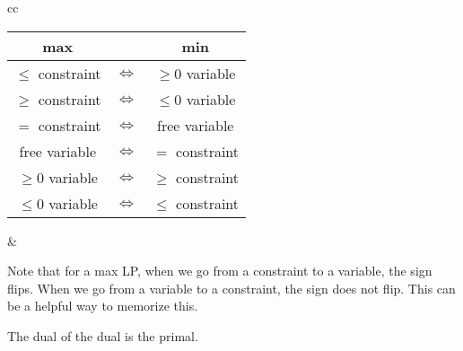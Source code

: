 \documentclass[a4paper]{report}
\begin{document}
	\begin{note}
		\begin{tabular}{cc}
			\begin{minipage}{.5\linewidth}\begin{tabular}{|c|c|c|}\hline \textbf{max} & & \textbf{min} \\ \hline $\leq$ constraint & $\iff$ & $\geq 0$ variable \\ \hline $\geq$ constraint & $\iff$ & $\leq 0$ variable \\ \hline $=$ constraint & $\iff$ & free variable \\ \hline \hline free variable & $\iff$ & $=$ constraint \\ \hline $\geq 0$ variable & $\iff$ & $\geq$ constraint \\ \hline $\leq 0$ variable & $\iff$ & $\leq$ constraint \\ \hline\end{tabular}\end{minipage} & \begin{minipage}{.5\linewidth}Note that for a max LP, when we go from a constraint to a variable, the sign flips. When we go from a variable to a constraint, the sign does not flip. This can be a helpful way to memorize this.\end{minipage} %
		\end{tabular}
	\end{note}

	\begin{remark}
		The dual of the dual is the primal.
	\end{remark}
\end{document}
